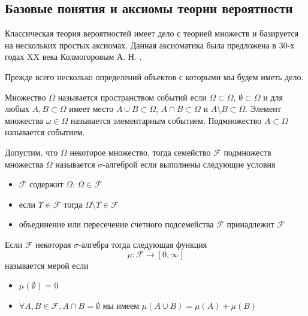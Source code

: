 \subsection{Базовые понятия и аксиомы теории вероятности}

Классическая теория вероятностей имеет дело с теорией множеств и
базируется на нескольких простых аксиомах. Данная аксиоматика была
предложена в 30-х годах XX века Колмогоровым
А. Н. \cite{bKolmogorov74basic}. 

Прежде всего несколько определений объектов с которыми мы будем иметь
дело. 

\begin{definition}
\label{def:events_set}
  Множество $\Omega$ называется пространством событий если
  $\Omega \subset \Omega$, $\emptyset \subset \Omega$ и для любых
  $A,B \subset \Omega$ имеет место
  $A \cup B \subset \Omega$, $A \cap B \subset \Omega$ и
  $A \setminus B \subset \Omega$.  Элемент множества
  $\omega \in \Omega$ называется элементарным событием. Подмножество 
  $A \subset \Omega$ называется событием.
\end{definition}

\begin{definition}
\label{def:sigma_algebra}
Допустим, что $\Omega$ некоторое множество, тогда семейство
$\mathcal{F}$ подмножеств множества $\Omega$ называется
$\sigma$-алгеброй если выполнены следующие условия
\begin{itemize}
\item $\mathcal{F}$ содержит $\Omega$: $\Omega \in \mathcal{F}$
\item если $\Upsilon  \in \mathcal{F}$ тогда $\Omega \setminus \Upsilon
  \in \mathcal{F}$
\item объединение или пересечение счетного подсемейства $\mathcal{F}$
  принадлежит $\mathcal{F}$
\end{itemize}
\end{definition}

\begin{definition}[Мера]
\label{def:measure} 
Если $\mathcal{F}$ некоторая $\sigma$-алгебра тогда
следующая функция 
\[
\mu: \mathcal{F} \to \left[0, \infty\right]
\]
называется мерой если 
\begin{itemize}
\item $\mu\left(\emptyset\right) = 0$
\item $\forall A, B \in \mathcal{F}, A \cap B = \emptyset$ мы имеем
$\mu\left(A \cup B\right) = \mu\left(A\right) +
  \mu\left(B\right)$ 
\end{itemize}
\end{definition}


